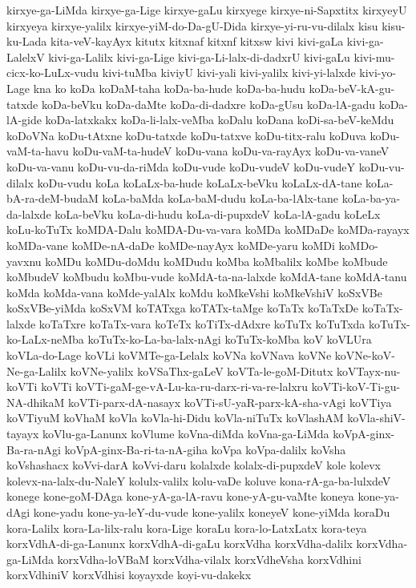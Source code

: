 {kirxye-ga-LiMda
kirxye-ga-Lige
kirxye-gaLu
kirxyege
kirxye-ni-Sapxtitx
kirxyeyU
kirxyeya
kirxye-yalilx
kirxye-yiM-do-Da-gU-Dida
kirxye-yi-ru-vu-dilalx
kisu
kisu-ku-Lada
kita-veV-kayAyx
kitutx
kitxnaf
kitxnf
kitxsw
kivi
kivi-gaLa
kivi-ga-LalelxV
kivi-ga-Lalilx
kivi-ga-Lige
kivi-ga-Li-lalx-di-dadxrU
kivi-gaLu
kivi-mu-cicx-ko-LuLx-vudu
kivi-tuMba
kiviyU
kivi-yali
kivi-yalilx
kivi-yi-lalxde
kivi-yo-Lage
kna
ko
koDa
koDaM-taha
koDa-ba-hude
koDa-ba-hudu
koDa-beV-kA-gu-tatxde
koDa-beVku
koDa-daMte
koDa-di-dadxre
koDa-gUsu
koDa-lA-gadu
koDa-lA-gide
koDa-latxkakx
koDa-li-lalx-veMba
koDalu
koDana
koDi-sa-beV-keMdu
koDoVNa
koDu-tAtxne
koDu-tatxde
koDu-tatxve
koDu-titx-ralu
koDuva
koDu-vaM-ta-havu
koDu-vaM-ta-hudeV
koDu-vana
koDu-va-rayAyx
koDu-va-vaneV
koDu-va-vanu
koDu-vu-da-riMda
koDu-vude
koDu-vudeV
koDu-vudeY
koDu-vu-dilalx
koDu-vudu
koLa
koLaLx-ba-hude
koLaLx-beVku
koLaLx-dA-tane
koLa-bA-ra-deM-budaM
koLa-baMda
koLa-baM-dudu
koLa-ba-lAlx-tane
koLa-ba-ya-da-lalxde
koLa-beVku
koLa-di-hudu
koLa-di-pupxdeV
koLa-lA-gadu
koLeLx
koLu-koTuTx
koMDA-Dalu
koMDA-Du-va-vara
koMDa
koMDaDe
koMDa-rayayx
koMDa-vane
koMDe-nA-daDe
koMDe-nayAyx
koMDe-yaru
koMDi
koMDo-yavxnu
koMDu
koMDu-doMdu
koMDudu
koMba
koMbalilx
koMbe
koMbude
koMbudeV
koMbudu
koMbu-vude
koMdA-ta-na-lalxde
koMdA-tane
koMdA-tanu
koMda
koMda-vana
koMde-yalAlx
koMdu
koMkeVshi
koMkeVshiV
koSxVBe
koSxVBe-yiMda
koSxVM
koTATxga
koTATx-taMge
koTaTx
koTaTxDe
koTaTx-lalxde
koTaTxre
koTaTx-vara
koTeTx
koTiTx-dAdxre
koTuTx
koTuTxda
koTuTx-ko-LaLx-neMba
koTuTx-ko-La-ba-lalx-nAgi
koTuTx-koMba
koV
koVLUra
koVLa-do-Lage
koVLi
koVMTe-ga-Lelalx
koVNa
koVNava
koVNe
koVNe-koV-Ne-ga-Lalilx
koVNe-yalilx
koVSaThx-gaLeV
koVTa-le-goM-Ditutx
koVTayx-nu-koVTi
koVTi
koVTi-gaM-ge-vA-Lu-ka-ru-darx-ri-va-re-lalxru
koVTi-koV-Ti-gu-NA-dhikaM
koVTi-parx-dA-nasayx
koVTi-sU-yaR-parx-kA-sha-vAgi
koVTiya
koVTiyuM
koVhaM
koVla
koVla-hi-Didu
koVla-niTuTx
koVlashAM
koVla-shiV-tayayx
koVlu-ga-Lanunx
koVlume
koVna-diMda
koVna-ga-LiMda
koVpA-ginx-Ba-ra-nAgi
koVpA-ginx-Ba-ri-ta-nA-giha
koVpa
koVpa-dalilx
koVsha
koVshashacx
koVvi-darA
koVvi-daru
kolalxde
kolalx-di-pupxdeV
kole
kolevx
kolevx-na-lalx-du-NaleY
kolulx-valilx
kolu-vaDe
koluve
kona-rA-ga-ba-lulxdeV
konege
kone-goM-DAga
kone-yA-ga-lA-ravu
kone-yA-gu-vaMte
koneya
kone-ya-dAgi
kone-yadu
kone-ya-leY-du-vude
kone-yalilx
koneyeV
kone-yiMda
koraDu
kora-Lalilx
kora-La-lilx-ralu
kora-Lige
koraLu
kora-lo-LatxLatx
kora-teya
korxVdhA-di-ga-Lanunx
korxVdhA-di-gaLu
korxVdha
korxVdha-dalilx
korxVdha-ga-LiMda
korxVdha-loVBaM
korxVdha-vilalx
korxVdheVsha
korxVdhini
korxVdhiniV
korxVdhisi
koyayxde
koyi-vu-dakekx
}
